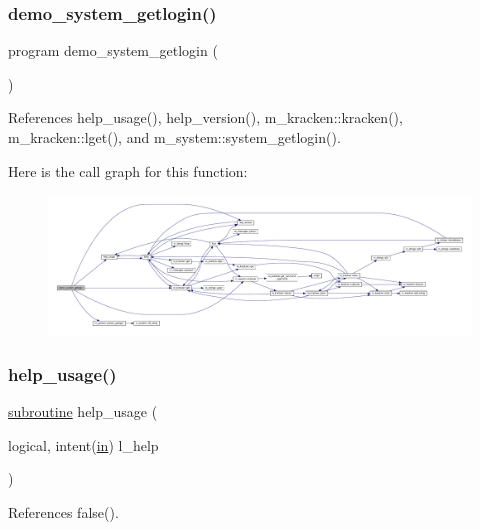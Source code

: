 \subsubsection{\texorpdfstring{demo\+\_\+system\+\_\+getlogin()}{demo\_system\_getlogin()}}
{\footnotesize\ttfamily program demo\+\_\+system\+\_\+getlogin (\begin{DoxyParamCaption}{ }\end{DoxyParamCaption})}



References help\+\_\+usage(), help\+\_\+version(), m\+\_\+kracken\+::kracken(), m\+\_\+kracken\+::lget(), and m\+\_\+system\+::system\+\_\+getlogin().

Here is the call graph for this function\+:
\nopagebreak
\begin{figure}[H]
\begin{center}
\leavevmode
\includegraphics[width=350pt]{__logname_8f90_a8ae53eddb485d4c8597c4d4a204181a8_cgraph}
\end{center}
\end{figure}
\mbox{\label{__logname_8f90_a3e09a3b52ee8fb04eeb93fe5761626a8}} 
\subsubsection{\texorpdfstring{help\+\_\+usage()}{help\_usage()}}
{\footnotesize\ttfamily \hyperlink{M__stopwatch_83_8txt_acfbcff50169d691ff02d4a123ed70482}{subroutine} help\+\_\+usage (\begin{DoxyParamCaption}\item[{logical, intent(\hyperlink{M__journal_83_8txt_afce72651d1eed785a2132bee863b2f38}{in})}]{l\+\_\+help }\end{DoxyParamCaption})}



References false().

